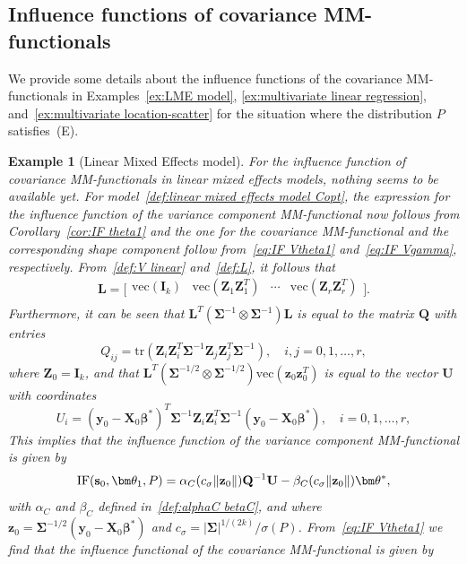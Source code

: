 \documentclass{article}
\numberwithin{equation}{section}
\theoremstyle{plain}
\newtheorem{example}{Example}
\newcommand{\vc}{\mathrm{vec}}
\newcommand{\bbeta}{\bm\beta}
\newcommand{\btheta}{\bm\theta}
\newcommand{\bSigma}{\mathbf{\Sigma}}
\newcommand{\by}{\mathbf{y}}
\newcommand{\bs}{\mathbf{s}}
\newcommand{\bz}{\mathbf{z}}
\newcommand{\bX}{\mathbf{X}}
\newcommand{\bZ}{\mathbf{Z}}
\newcommand{\bI}{\mathbf{I}}
\newcommand{\bL}{\mathbf{L}}
\newcommand{\bU}{\mathbf{U}}
\newcommand{\bQ}{\mathbf{Q}}
\begin{document}
\subsection{Influence functions of covariance MM-functionals}
We provide some details about the influence functions of the covariance MM-functionals
in Examples~\ref{ex:LME model}, \ref{ex:multivariate linear regression}, and~\ref{ex:multivariate location-scatter}
for the situation where the distribution $P$ satisfies~(E).
\setcounter{example}{0}
\begin{example}[Linear Mixed Effects model]
\label{ex:IF LME}
For the influence function of covariance MM-functionals in linear mixed effects models,
nothing seems to be available yet.
For model~\eqref{def:linear mixed effects model Copt}, the expression for the influence function of the 
variance component MM-functional now follows from Corollary~\ref{cor:IF theta1} and
the one for the covariance MM-functional and the corresponding shape component follow from~\eqref{eq:IF Vtheta1}
and~\eqref{eq:IF Vgamma}, respectively.
From~\eqref{def:V linear} and~\eqref{def:L}, it follows that 
\begin{equation}
\label{eq:L for LME}
\bL
=
\Big[
  \begin{array}{cccc}
    \vc\left(\bI_k\right) & \vc\left(\bZ_1\bZ_1^T\right) 
 & \cdots &     \vc\left(\bZ_r\bZ_r^T\right) \\
  \end{array}
\Big].
\end{equation}
Furthermore, it can be seen that $\bL^T(\bSigma^{-1}\otimes\bSigma^{-1})\bL$ is equal to the matrix $\bQ$
with entries
\begin{equation}
\label{eq:entries Q}
Q_{ij}=\text{tr}\left(\bZ_i\bZ_i^T\bSigma^{-1}\bZ_j\bZ_j^T\bSigma^{-1}\right),
\quad
i,j=0,1,\ldots,r,
\end{equation}
where $\bZ_0=\bI_k$, and that 
$\bL^T\left(\bSigma^{-1/2}\otimes\bSigma^{-1/2}\right)\vc\left(\bz_0\bz_0^T\right)$ is equal to the vector $\bU$
with coordinates
\[
U_i=(\by_0-\bX_0\bbeta^*)^T\bSigma^{-1}\bZ_i\bZ_i^T\bSigma^{-1}(\by_0-\bX_0\bbeta^*),
\quad
i=0,1,\ldots,r,
\]
This implies that the influence function of the variance component MM-functional is given by
\[
\text{\rm IF}(\bs_0,\btheta_1,P)
=
\alpha_C(c_\sigma\|\bz_0\|)\bQ^{-1}\bU
-
\beta_C(c_\sigma\|\bz_0\|)\btheta^*,
\]
with $\alpha_C$ and $\beta_C$ defined in~\eqref{def:alphaC betaC},
and
where $\bz_0=\bSigma^{-1/2}(\by_0-\bX_0\bbeta^*)$ and $c_\sigma=|\bSigma|^{1/(2k)}/\sigma(P)$.
From~\eqref{eq:IF Vtheta1} we find that the influence functional of the covariance MM-functional is given by

\end{example}
\end{document}
